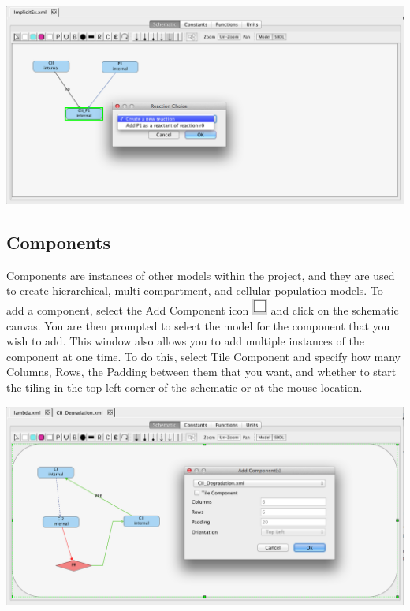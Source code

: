 \documentclass[titlepage,11pt]{article}
\begin{document}
\begin{center}
\includegraphics[width=155mm]{screenshots/implicitReactions} 
\end{center}

\subsection{\label{Components}Components}

\noindent
Components are instances of other models within the project, and they are used to create hierarchical, multi-compartment, and cellular population models.  To add a component, select the Add Component icon \includegraphics{../gui/icons/modelview/add_component_selected} and click on the schematic canvas.  You are then prompted to select the model for the component that you wish to add.  This window also allows you to add multiple instances of the component at one time.  To do this, select Tile Component and specify how many Columns, Rows, the Padding between them that you want, and whether to start the tiling in the top left corner of the schematic or at the mouse location.  

\begin{center}
\includegraphics[width=160mm]{screenshots/addComponent}
\end{center}
\end{document}
